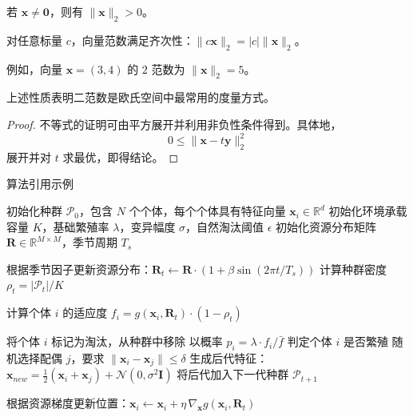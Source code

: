 \documentclass[a4paper, twoside, openany]{NCEPUDoctor}
\begin{document}
  \begin{corollary} %
  若 $\mathbf{x}\neq \mathbf{0}$，则有 $\|\mathbf{x}\|_2 > 0$。
  \end{corollary}

  \begin{proposition} %
  对任意标量 $c$，向量范数满足齐次性：$\|c\mathbf{x}\|_2=|c|\|\mathbf{x}\|_2$。
  \end{proposition}

  \begin{example} %
  例如，向量 $\mathbf{x}=(3,4)$ 的 $2$ 范数为 $\|\mathbf{x}\|_2=5$。
  \end{example}

  \begin{remark} %
  上述性质表明二范数是欧氏空间中最常用的度量方式。
  \end{remark}

  \begin{proof} %
  不等式的证明可由平方展开并利用非负性条件得到。具体地，
  \[
  0 \le \|\mathbf{x}-t\mathbf{y}\|_2^2
  \]
  展开并对 $t$ 求最优，即得结论。
  \end{proof}

  算法引用示例  %


  \begin{algorithm}[h]
    \caption{基于个体模拟的种群动态演化算法}
    \label{alg:population-sim}
    \begin{algorithmic}[1]
      \STATE 初始化种群 $\mathcal{P}_0$，包含 $N$ 个个体，每个个体具有特征向量 $\mathbf{x}_i \in \mathbb{R}^d$
      \STATE 初始化环境承载容量 $K$，基础繁殖率 $\lambda$，变异幅度 $\sigma$，自然淘汰阈值 $\epsilon$
      \STATE 初始化资源分布矩阵 $\mathbf{R} \in \mathbb{R}^{M \times M}$，季节周期 $T_s$

        \STATE 根据季节因子更新资源分布：$\mathbf{R}_t \gets \mathbf{R} \cdot (1 + \beta \sin(2\pi t / T_s))$
        \STATE 计算种群密度 $\rho_t = |\mathcal{P}_t| / K$

          \STATE 计算个体 $i$ 的适应度 $f_i = g(\mathbf{x}_i, \mathbf{R}_t) \cdot (1 - \rho_t)$

            \STATE 将个体 $i$ 标记为淘汰，从种群中移除
          \ELSE
            \STATE 以概率 $p_i = \lambda \cdot f_i / \bar{f}$ 判定个体 $i$ 是否繁殖
              \STATE 随机选择配偶 $j$，要求 $\|\mathbf{x}_i - \mathbf{x}_j\| \leq \delta$
              \STATE 生成后代特征：$\mathbf{x}_{new} = \frac{1}{2}(\mathbf{x}_i + \mathbf{x}_j) + \mathcal{N}(0, \sigma^2 \mathbf{I})$
              \STATE 将后代加入下一代种群 $\mathcal{P}_{t+1}$
            \ENDIF
          \ENDIF
        \ENDWHILE

          \STATE 根据资源梯度更新位置：$\mathbf{x}_i \gets \mathbf{x}_i + \eta \, \nabla_{\mathbf{x}} g(\mathbf{x}_i, \mathbf{R}_t)$
        \ENDFOR
      \ENDFOR
    \end{algorithmic}
  \end{algorithm}
  \clearpage
\end{document}
